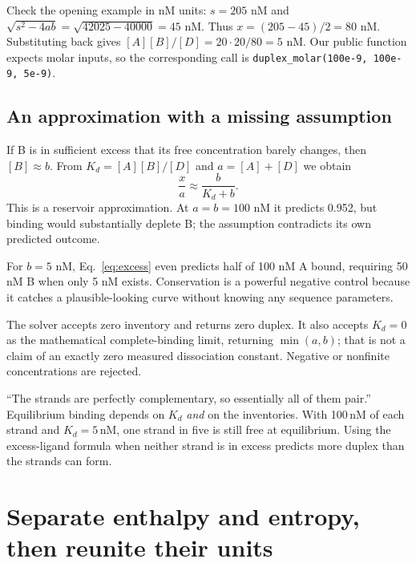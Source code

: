 Check the opening example in nM units: $s=205$ nM and
$\sqrt{s^2-4ab}=\sqrt{42025-40000}=45$ nM. Thus
$x=(205-45)/2=80$ nM. Substituting back gives
$[A][B]/[D]=20\cdot20/80=5$ nM.
Our public function expects molar inputs, so the corresponding call is
\texttt{duplex\_molar(100e-9, 100e-9, 5e-9)}.

\subsection{An approximation with a missing assumption}

If B is in sufficient excess that its free concentration barely changes,
then $[B]\approx b$. From $K_d=[A][B]/[D]$ and $a=[A]+[D]$ we obtain
\begin{equation}
\frac{x}{a}\approx\frac{b}{K_d+b}.
\label{eq:excess}
\end{equation}
This is a reservoir approximation. At $a=b=100$ nM it predicts 0.952,
but binding would substantially deplete B; the assumption contradicts its
own predicted outcome.


For $b=5$ nM, Eq.~\ref{eq:excess} even predicts half of 100 nM A bound,
requiring 50 nM B when only 5 nM exists. Conservation is a powerful
negative control because it catches a plausible-looking curve without
knowing any sequence parameters.

The solver accepts zero inventory and returns zero duplex. It also accepts
$K_d=0$ as the mathematical complete-binding limit, returning $\min(a,b)$;
that is not a claim of an exactly zero measured dissociation constant.
Negative or nonfinite concentrations are rejected.

\begin{Pitfall}
``The strands are perfectly complementary, so essentially all of them pair.''
Equilibrium binding depends on $K_d$ \emph{and} on the inventories. With
100\,nM of each strand and $K_d=5$\,nM, one strand in five is still free at
equilibrium. Using the excess-ligand formula when neither strand is in excess
predicts more duplex than the strands can form.
\end{Pitfall}

\section{Separate enthalpy and entropy, then reunite their units}

